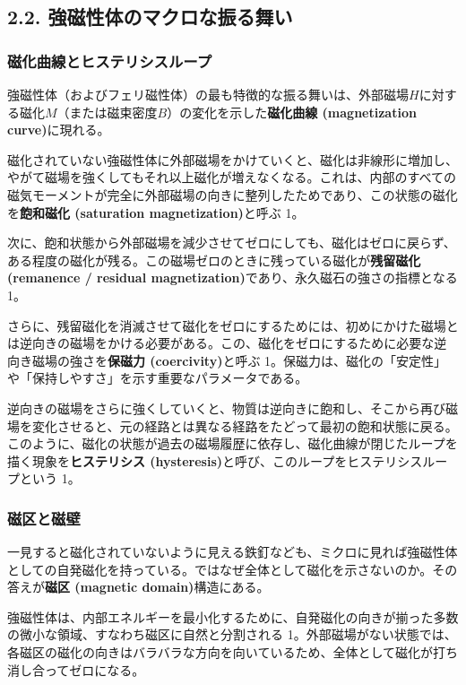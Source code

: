 \documentclass[11pt,a4paper]{ltjsarticle}
\begin{document}
\subsection*{2.2. 強磁性体のマクロな振る舞い}

\subsubsection*{磁化曲線とヒステリシスループ}

強磁性体（およびフェリ磁性体）の最も特徴的な振る舞いは、外部磁場$H$に対する磁化$M$（または磁束密度$B$）の変化を示した\textbf{磁化曲線 (magnetization curve)}に現れる。

磁化されていない強磁性体に外部磁場をかけていくと、磁化は非線形に増加し、やがて磁場を強くしてもそれ以上磁化が増えなくなる。これは、内部のすべての磁気モーメントが完全に外部磁場の向きに整列したためであり、この状態の磁化を\textbf{飽和磁化 (saturation magnetization)}と呼ぶ 1。

次に、飽和状態から外部磁場を減少させてゼロにしても、磁化はゼロに戻らず、ある程度の磁化が残る。この磁場ゼロのときに残っている磁化が\textbf{残留磁化 (remanence / residual magnetization)}であり、永久磁石の強さの指標となる 1。

さらに、残留磁化を消滅させて磁化をゼロにするためには、初めにかけた磁場とは逆向きの磁場をかける必要がある。この、磁化をゼロにするために必要な逆向き磁場の強さを\textbf{保磁力 (coercivity)}と呼ぶ 1。保磁力は、磁化の「安定性」や「保持しやすさ」を示す重要なパラメータである。

逆向きの磁場をさらに強くしていくと、物質は逆向きに飽和し、そこから再び磁場を変化させると、元の経路とは異なる経路をたどって最初の飽和状態に戻る。このように、磁化の状態が過去の磁場履歴に依存し、磁化曲線が閉じたループを描く現象を\textbf{ヒステリシス (hysteresis)}と呼び、このループをヒステリシスループという 1。

\subsubsection*{磁区と磁壁}

一見すると磁化されていないように見える鉄釘なども、ミクロに見れば強磁性体としての自発磁化を持っている。ではなぜ全体として磁化を示さないのか。その答えが\textbf{磁区 (magnetic domain)}構造にある。

強磁性体は、内部エネルギーを最小化するために、自発磁化の向きが揃った多数の微小な領域、すなわち磁区に自然と分割される 1。外部磁場がない状態では、各磁区の磁化の向きはバラバラな方向を向いているため、全体として磁化が打ち消し合ってゼロになる。
\end{document}
